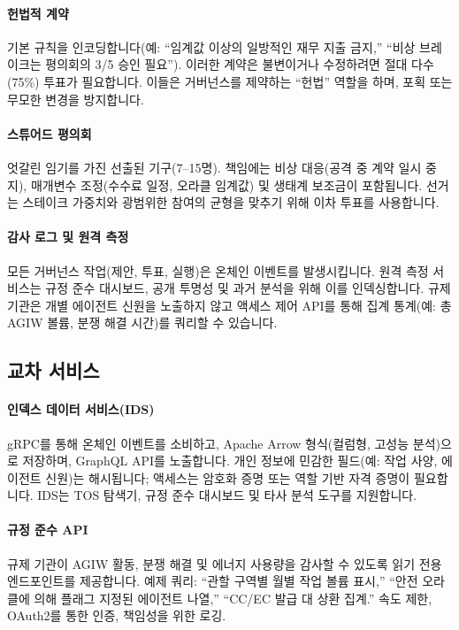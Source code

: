 \documentclass[11pt]{article}
\begin{document}
\paragraph{헌법적 계약} 기본 규칙을 인코딩합니다(예: ``임계값 이상의 일방적인 재무 지출 금지,'' ``비상 브레이크는 평의회의 3/5 승인 필요''). 이러한 계약은 불변이거나 수정하려면 절대 다수(75\%) 투표가 필요합니다. 이들은 거버넌스를 제약하는 ``헌법'' 역할을 하며, 포획 또는 무모한 변경을 방지합니다.

\paragraph{스튜어드 평의회} 엇갈린 임기를 가진 선출된 기구(7--15명). 책임에는 비상 대응(공격 중 계약 일시 중지), 매개변수 조정(수수료 일정, 오라클 임계값) 및 생태계 보조금이 포함됩니다. 선거는 스테이크 가중치와 광범위한 참여의 균형을 맞추기 위해 이차 투표를 사용합니다.

\paragraph{감사 로그 및 원격 측정} 모든 거버넌스 작업(제안, 투표, 실행)은 온체인 이벤트를 발생시킵니다. 원격 측정 서비스는 규정 준수 대시보드, 공개 투명성 및 과거 분석을 위해 이를 인덱싱합니다. 규제 기관은 개별 에이전트 신원을 노출하지 않고 액세스 제어 API를 통해 집계 통계(예: 총 AGIW 볼륨, 분쟁 해결 시간)를 쿼리할 수 있습니다.

\subsection{교차 서비스}
\paragraph{인덱스 데이터 서비스(IDS)} gRPC를 통해 온체인 이벤트를 소비하고, Apache Arrow 형식(컬럼형, 고성능 분석)으로 저장하며, GraphQL API를 노출합니다. 개인 정보에 민감한 필드(예: 작업 사양, 에이전트 신원)는 해시됩니다; 액세스는 암호화 증명 또는 역할 기반 자격 증명이 필요합니다. IDS는 TOS 탐색기, 규정 준수 대시보드 및 타사 분석 도구를 지원합니다.

\paragraph{규정 준수 API} 규제 기관이 AGIW 활동, 분쟁 해결 및 에너지 사용량을 감사할 수 있도록 읽기 전용 엔드포인트를 제공합니다. 예제 쿼리: ``관할 구역별 월별 작업 볼륨 표시,'' ``안전 오라클에 의해 플래그 지정된 에이전트 나열,'' ``CC/EC 발급 대 상환 집계.'' 속도 제한, OAuth2를 통한 인증, 책임성을 위한 로깅.
\end{document}

